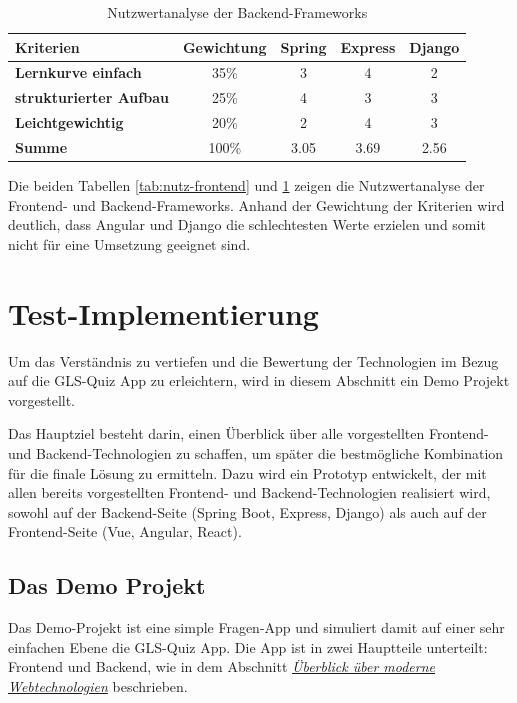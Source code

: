 \documentclass[biblatex]{lni}
\begin{document}
\begin{table}[h!]
  \centering
  \caption{Nutzwertanalyse der Backend-Frameworks}
  \label{tab:nutz-backend}
  \begin{tabular}{@{}lcccc@{}}
    \toprule
    \textbf{Kriterien} & \textbf{Gewichtung} & \textbf{Spring} & \textbf{Express} & \textbf{Django} \\ \midrule
    \textbf{Lernkurve einfach} & 35\% & 3 & 4 & 2 \\ \midrule
    \textbf{strukturierter Aufbau} & 25\% & 4 & 3 & 3 \\ \midrule
    \textbf{Leichtgewichtig} & 20\% & 2 & 4 & 3 \\ \midrule
    \textbf{Summe} & 100\% & 3.05 & 3.69 & 2.56 \\ \bottomrule
  \end{tabular}
\end{table}

Die beiden Tabellen \ref{tab:nutz-frontend} und \ref{tab:nutz-backend} zeigen die Nutzwertanalyse der Frontend- und Backend-Frameworks.
Anhand der Gewichtung der Kriterien wird deutlich,
dass Angular und Django die schlechtesten Werte erzielen und somit nicht für eine Umsetzung geeignet sind.
\newpage

\section{Test-Implementierung}

Um das Verständnis zu vertiefen und die Bewertung der Technologien im Bezug auf die GLS-Quiz App zu erleichtern,
wird in diesem Abschnitt ein Demo Projekt vorgestellt.

Das Hauptziel besteht darin,
einen Überblick über alle vorgestellten Frontend- und Backend-Technologien zu schaffen,
um später die bestmögliche Kombination für die finale Lösung zu ermitteln.
Dazu wird ein Prototyp entwickelt, der mit allen bereits vorgestellten Frontend- und Backend-Technologien realisiert wird,
sowohl auf der Backend-Seite (Spring Boot, Express, Django) als auch auf der Frontend-Seite (Vue, Angular, React).

\subsection{Das Demo Projekt}

Das Demo-Projekt ist eine simple Fragen-App und simuliert damit auf einer sehr einfachen Ebene die GLS-Quiz App.
Die App ist in zwei Hauptteile unterteilt: Frontend und Backend, wie in dem Abschnitt \hyperref[sec:moderne-webtechnologien]{\textit{Überblick über moderne Webtechnologien}} beschrieben.
\end{document}

